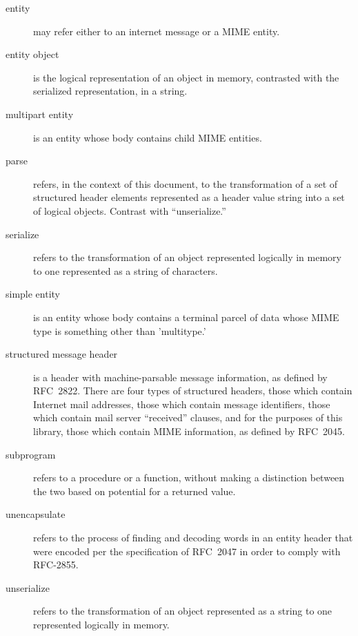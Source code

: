 \documentclass[11pt]{article}
\begin{document}
\begin{description}
\item[entity] may refer either to an internet message or a MIME
  entity.

\item[entity object] is the logical representation of an object in
  memory, contrasted with the serialized representation, in a
  string.

\item[multipart entity] is an entity whose body contains child MIME
  entities. 

\item[parse] refers, in the context of this document, to the
  transformation of a set of structured header elements represented as
  a header value string into a set of logical objects. Contrast with
  ``unserialize.''

\item[serialize] refers to the transformation of an object represented
  logically in memory to one represented as a string of characters.

\item[simple entity] is an entity whose body contains a terminal
  parcel of data whose MIME type is something other than 'multitype.'

\item[structured message header] is a header with machine-parsable message
  information, as defined by RFC~2822. There are four types of
  structured headers, those which contain Internet mail addresses,
  those which contain message identifiers, those which contain mail
  server ``received'' clauses, and for the purposes of this library,
  those which contain MIME information, as defined by RFC~2045.

\item[subprogram] refers to a procedure or a function, without making
  a distinction between the two based on potential for a returned
  value.

\item[unencapsulate] refers to the process of finding and decoding
  words in an entity header that were encoded per the specification of
  RFC~2047 in order to comply with RFC-2855.

\item[unserialize] refers to the transformation of an object
  represented as a string to one represented logically in memory.

\end{description}

\end{document}
